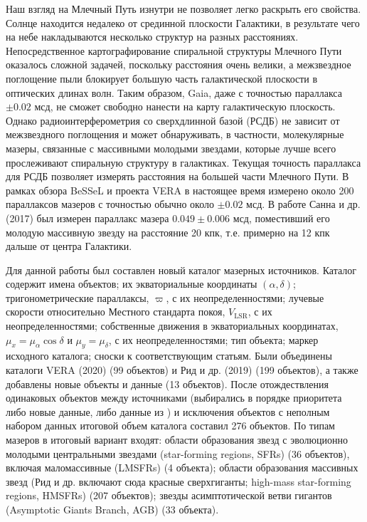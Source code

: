 \documentclass[a4paper, oneside, 14pt]{article}
\begin{document}
Наш взгляд на Млечный Путь изнутри не позволяет легко раскрыть его свойства. Солнце находится недалеко от срединной плоскости Галактики, в результате чего на небе накладываются несколько структур на разных расстояниях. Непосредственное картографирование спиральной структуры Млечного Пути оказалось сложной задачей, поскольку расстояния очень велики, а межзвездное поглощение пыли блокирует большую часть галактической плоскости в оптических длинах волн. Таким образом, Gaia, даже с точностью параллакса $ \pm 0.02 $ мсд, не сможет свободно нанести на карту галактическую плоскость. Однако радиоинтерферометрия со сверхдлинной базой (РСДБ) не зависит от межзвездного поглощения и может обнаруживать, в частности, молекулярные мазеры, связанные с массивными молодыми звездами, которые лучше всего прослеживают спиральную структуру в галактиках. Текущая точность параллакса для РСДБ позволяет измерять расстояния на большей части Млечного Пути. В рамках обзора BeSSeL \cite{BeSSeL} и проекта VERA \cite{VERA.2020} в настоящее время измерено около 200 параллаксов мазеров с точностью обычно около $ \pm 0.02 $ мсд. В работе Санна и др. (2017) \cite{S.2017} был измерен параллакс мазера $ 0.049 \pm 0.006 $ мсд, поместивший его молодую массивную звезду на расстояние 20 кпк, т.е. примерно на 12 кпк дальше от центра Галактики.

Для данной работы был составлен новый каталог мазерных источников. Каталог содержит имена объектов; их экваториальные координаты $ (\alpha, \delta) $; тригонометрические параллаксы, $ \varpi $, с их неопределенностями; лучевые скорости относительно Местного стандарта покоя, $ V_\text{LSR} $, с их неопределенностями; собственные движения в экваториальных координатах, $ \mu_x = \mu_\alpha \cos{\delta} $ и $ \mu_y = \mu_\delta $, с их неопределенностями; тип объекта; маркер исходного каталога; сноски к соответствующим статьям. Были объединены каталоги VERA (2020) \cite{VERA.2020} (99 объектов) и Рид и др. (2019) \cite{R.2019} (199 объектов), а также добавлены новые объекты и данные (13 объектов). После отождествления одинаковых объектов между источниками (выбирались в порядке приоритета либо новые данные, либо данные из \cite{R.2019}) и исключения объектов с неполным набором данных итоговой объем каталога составил 276 объектов. По типам мазеров в итоговый вариант входят: области образования звезд с эволюционно молодыми центральными звездами (star-forming regions, SFRs) (36 объектов), включая маломассивные (LMSFRs) (4 объекта); области образования массивных звезд (Рид и др. включают сюда красные сверхгиганты; high-mass star-forming regions, HMSFRs) (207 объектов); звезды асимптотической ветви гигантов (Asymptotic Giants Branch, AGB) (33 объекта).
\end{document}
